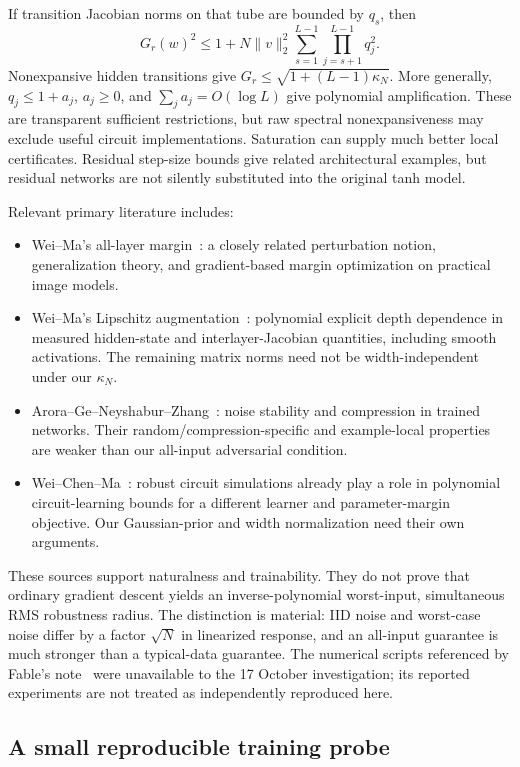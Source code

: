 \documentclass[11pt]{article}
\begin{document}
If transition Jacobian norms on that tube are bounded by $q_s$, then
\[
 G_r(w)^2\le1+N\|v\|_2^2
 \sum_{s=1}^{L-1}\prod_{j=s+1}^{L-1}q_j^2.
\]
Nonexpansive hidden transitions give $G_r\le\sqrt{1+(L-1)\kappa_N}$.
More generally, $q_j\le1+a_j$, $a_j\ge0$, and
$\sum_j a_j=O(\log L)$ give polynomial amplification. These are transparent
sufficient restrictions, but raw spectral nonexpansiveness may exclude
useful circuit implementations. Saturation can supply much better local
certificates. Residual step-size bounds give related architectural examples,
but residual networks are not silently substituted into the original tanh model.

Relevant primary literature includes:
\begin{itemize}
\item Wei--Ma's all-layer margin~\cite{weima2020}: a closely related
perturbation notion, generalization theory, and gradient-based margin
optimization on practical image models.
\item Wei--Ma's Lipschitz augmentation~\cite{weima2019}: polynomial explicit
depth dependence in measured hidden-state and interlayer-Jacobian quantities,
including smooth activations. The remaining matrix norms need not be
width-independent under our $\kappa_N$.
\item Arora--Ge--Neyshabur--Zhang~\cite{arora}: noise stability and compression
in trained networks. Their random/compression-specific and example-local
properties are weaker than our all-input adversarial condition.
\item Wei--Chen--Ma~\cite{weichenma}: robust circuit simulations already play
a role in polynomial circuit-learning bounds for a different learner and
parameter-margin objective. Our Gaussian-prior and width normalization need
their own arguments.
\end{itemize}

These sources support naturalness and trainability. They do not prove that
ordinary gradient descent yields an inverse-polynomial worst-input,
simultaneous RMS robustness radius. The distinction is material:
IID noise and worst-case noise differ by a factor $\sqrt N$ in linearized
response, and an all-input guarantee is much stronger than a typical-data
guarantee. The numerical scripts referenced by Fable's note~\cite{fable}
were unavailable to the 17 October investigation; its reported experiments
are not treated as independently reproduced here.

\subsection{A small reproducible training probe}
\end{document}
